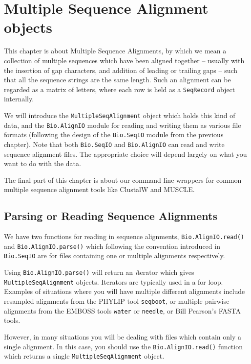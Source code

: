 \chapter{Multiple Sequence Alignment objects}
\label{chapter:align}

This chapter is about Multiple Sequence Alignments, by which we mean a collection of
multiple sequences which have been aligned together -- usually with the insertion of gap
characters, and addition of leading or trailing gaps -- such that all the sequence
strings are the same length. Such an alignment can be regarded as a matrix of letters,
where each row is held as a \verb|SeqRecord| object internally.

We will introduce the \verb|MultipleSeqAlignment| object which holds this kind of data,
and the \verb|Bio.AlignIO| module for reading and writing them as various file formats
(following the design of the \verb|Bio.SeqIO| module from the previous chapter).
Note that both \verb|Bio.SeqIO| and \verb|Bio.AlignIO| can read and write sequence
alignment files.  The appropriate choice will depend largely on what you want to do
with the data.

The final part of this chapter is about our command line wrappers for common multiple
sequence alignment tools like ClustalW and MUSCLE.

\section{Parsing or Reading Sequence Alignments}

We have two functions for reading in sequence alignments, \verb|Bio.AlignIO.read()| and \verb|Bio.AlignIO.parse()| which following the convention introduced in \verb|Bio.SeqIO| are for files containing one or multiple alignments respectively.

Using \verb|Bio.AlignIO.parse()| will return an {\textit iterator} which gives \verb|MultipleSeqAlignment| objects.  Iterators are typically used in a for loop.  Examples of situations where you will have multiple different alignments include resampled alignments from the PHYLIP tool \verb|seqboot|, or multiple pairwise alignments from the EMBOSS tools \verb|water| or \verb|needle|, or Bill Pearson's FASTA tools.

However, in many situations you will be dealing with files which contain only a single alignment.  In this case, you should use the \verb|Bio.AlignIO.read()| function which returns a single \verb|MultipleSeqAlignment| object.

